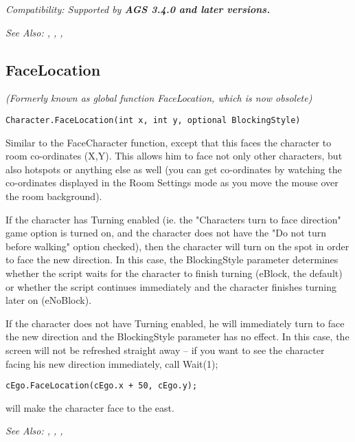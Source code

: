 \it{Compatibility:} Supported by \bf{AGS 3.4.0} and later versions.

\it{See Also:} ,
,
,


\subsection{FaceLocation}\label{Character.FaceLocation}%

\it{(Formerly known as global function FaceLocation, which is now obsolete)}

\begin{verbatim}
Character.FaceLocation(int x, int y, optional BlockingStyle)
\end{verbatim}
Similar to the FaceCharacter function, except that this faces the character
to room co-ordinates (X,Y). This allows him to face not only other characters,
but also hotspots or anything else as well (you can get co-ordinates by
watching the co-ordinates displayed in the Room Settings mode as you move the mouse
over the room background).

If the character has Turning enabled (ie. the "Characters turn to face direction" game
option is turned on, and the character does not have the "Do not turn before walking"
option checked), then the character will turn on the spot in order to face the new direction.
In this case, the BlockingStyle parameter determines whether the script waits for the
character to finish turning (eBlock, the default) or whether the script continues immediately
and the character finishes turning later on (eNoBlock).

If the character does not have Turning enabled, he will immediately turn to face the
new direction and the BlockingStyle parameter has no effect. In this case, the screen
will not be refreshed straight away -- if you want to see the character facing his new direction
immediately, call  Wait(1);

\begin{verbatim}
cEgo.FaceLocation(cEgo.x + 50, cEgo.y);
\end{verbatim}
will make the character face to the east.

\it{See Also:} ,
,
,


